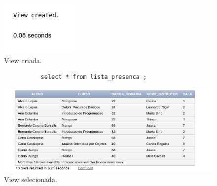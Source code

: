 \documentclass[
article,			%
11pt,				%
oneside,			%
a4paper,			%
english,			%
brazil,				%
sumario=tradicional
]{abntex2}
\begin{document}
\begin{enumerate}
\begin{verbatim}
						\end{verbatim}
						\begin{center}
							\begin{figure}[H]
								\centering
								\includegraphics[scale=0.5]{./imagens/at-07.png}
								\caption{View criada.}
								\label{rota-1}
							\end{figure}
						\end{center}
						\begin{verbatim}
				select * from lista_presenca ;
						\end{verbatim}
						\begin{center}
							\begin{figure}[H]
								\centering
								\includegraphics[scale=0.5]{./imagens/at-08.png}
								\caption{View selecionada.}
								\label{rota-1}
							\end{figure}
						\end{center}
						
	\end{enumerate}				
			
\end{document}
